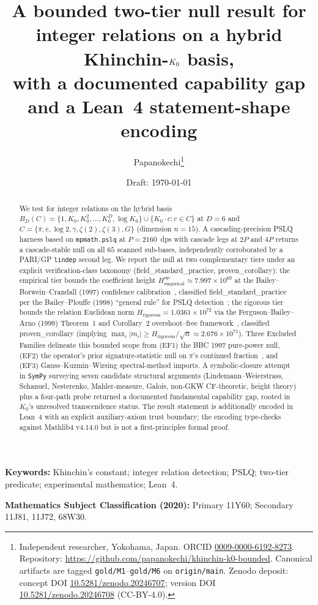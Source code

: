 \documentclass[11pt,a4paper]{article}
\title{A bounded two-tier null result for integer relations on a hybrid
  Khinchin-$\K$ basis,\\ with a documented capability gap and a Lean~4
  statement-shape encoding}
\author{Papanokechi\thanks{Independent researcher, Yokohama, Japan.
  ORCID \href{https://orcid.org/0009-0000-6192-8273}{0009-0000-6192-8273}.
  Repository: \url{https://github.com/papanokechi/khinchin-k0-bounded}. Canonical
  artifacts are tagged \texttt{gold/M1}--\texttt{gold/M6} on \texttt{origin/main}.
  Zenodo deposit: concept DOI \href{https://doi.org/10.5281/zenodo.20246707}{10.5281/zenodo.20246707};
  version DOI \href{https://doi.org/10.5281/zenodo.20246708}{10.5281/zenodo.20246708}
  (CC-BY-4.0).}}
\date{Draft: \today}
\newcommand{\K}{K_{0}}
\newcommand{\Hrig}{H_{\mathrm{rigorous}}}
\newcommand{\Hempop}{H_{\mathrm{empirical}}^{\mathrm{op}}}
\newcommand{\BDC}{B_{D}(C)}
\newcommand{\fsp}{\textsf{field\_standard\_practice}}
\newcommand{\pc}{\textsf{proven\_corollary}}
\begin{document}
\maketitle

\begin{abstract}
We test for integer relations on the hybrid basis
$\BDC = \{1, \K, \K^{2}, \ldots, \K^{D}, \log\K\} \cup \{\K\cdot c : c \in C\}$
at $D=6$ and
$C=\{\pi, e, \log 2, \gamma, \zeta(2), \zeta(3), G\}$
(dimension $n=15$).
A cascading-precision PSLQ harness based on \texttt{mpmath.pslq} at
$P=2160$~dps with cascade legs at $2P$ and $4P$
returns a cascade-stable null on all $65$ scanned sub-bases,
independently corroborated by a PARI/GP \texttt{lindep} second leg.
We report the null at two complementary tiers under an explicit
verification-class taxonomy (\fsp{}, \pc{}):
the empirical tier bounds the coefficient height
$\Hempop \approx 7.997 \times 10^{69}$ at the Bailey--Borwein--Crandall (1997)
confidence calibration~\cite{bbc1997}, classified \fsp{} per the
Bailey--Plouffe (1998) ``general rule'' for PSLQ
detection~\cite{bailey1998};
the rigorous tier bounds the relation Euclidean norm
$\Hrig = 1.0361 \times 10^{72}$ via the
Ferguson--Bailey--Arno (1999) Theorem~1 and Corollary~2
overshoot--free framework~\cite{fba1999}, classified \pc{}
(implying $\max_{i}|m_{i}| \ge \Hrig/\sqrt{n} \approx 2.676 \times 10^{71}$).
Three Excluded Families
delineate this bounded scope from
(EF1) the BBC 1997 pure-power null,
(EF2) the operator's prior signature-statistic null on $\pi$'s continued
fraction~\cite{papanokechi2026signature},
and (EF3) Gauss--Kuzmin--Wirsing spectral-method imports.
A symbolic-closure attempt in \texttt{SymPy} surveying seven candidate structural
arguments (Lindemann--Weierstrass, Schanuel, Nesterenko, Mahler-measure, Galois,
non-GKW CF-theoretic, height theory) plus a four-path probe returned a documented
fundamental capability gap, rooted in $\K$'s unresolved transcendence status.
The result statement is additionally encoded in Lean~4 with an explicit
auxiliary-axiom trust boundary; the encoding type-checks against Mathlib4
v4.14.0 but is not a first-principles formal proof.
\end{abstract}

\bigskip

\noindent\textbf{Keywords:}
Khinchin's constant;
integer relation detection;
PSLQ;
two-tier predicate;
experimental mathematics;
Lean~4.

\medskip

\noindent\textbf{Mathematics Subject Classification (2020):}
Primary 11Y60;
Secondary 11J81, 11J72, 68W30.
\end{document}
